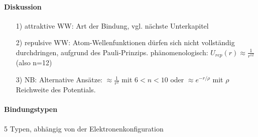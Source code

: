 \paragraph{Diskussion}
	\begin{itemize}
		\item[1)] attraktive WW: Art der Bindung, vgl. nächste Unterkapitel
		\item[2)] repulsive WW: Atom-Wellenfunktionen dürfen sich nicht vollständig durchdringen, aufgrund des Pauli-Prinzips. phänomenologisch: $U_{rep}(r)\approx \frac{1}{r^{12}}$(also n=12)
		\item[3)] NB: Alternative Ansätze: $\approx \frac{1}{r^2}$ mit $6<n<10$ oder $\approx e^{-r/\rho}$ mit $ \rho $ Reichweite des Potentials.
	\end{itemize}

\paragraph{Bindungstypen}
	5 Typen, abhängig von der Elektronenkonfiguration
